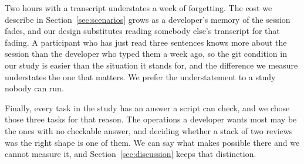 Two hours with a transcript understates a week of forgetting. The cost we describe in
Section~\ref{sec:scenarios} grows as a developer's memory of the session fades,
and our design substitutes reading somebody else's transcript for that fading.
A participant who has just read three sentences knows more about the session than
the developer who typed them a week ago, so the git condition in our study is
easier than the situation it stands for, and the difference we measure understates
the one that matters. We prefer the understatement to a study nobody can run.

Finally, every task in the study has an answer a script can check, and we chose
those three tasks for that reason. The operations a developer wants most may be
the ones with no checkable answer, and deciding whether a stack of two reviews
was the right shape is one of them. We can say what \sgt{} makes possible there
and we cannot measure it, and Section~\ref{sec:discussion} keeps that distinction.
